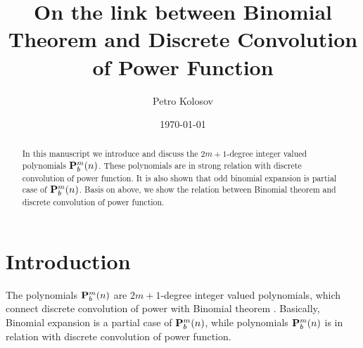 \documentclass[12pt,letterpaper,oneside,reqno]{amsart}
\title[On the link between Binomial Theorem and Disc. Conv. of Power Function]
{On the link between Binomial Theorem and Discrete Convolution of Power Function}
\author[Petro Kolosov]{Petro Kolosov}
\date{\today}
\newcommand \polynomialP [4][P]{{\mathbf{#1}}\sp{#2} \sb{#3}(#4)}
\numberwithin{equation}{section}
\begin{document}
    \begin{abstract}
        In this manuscript we introduce and discuss the $2m+1$-degree integer valued polynomials $\polynomialP{m}{b}{n}$.
        These polynomials are in strong relation with discrete convolution of power function.
        It is also shown that odd binomial expansion is partial case of $\polynomialP{m}{b}{n}$.
        Basis on above, we show the relation between Binomial theorem and discrete
        convolution of power function.
    \end{abstract}
    \maketitle
    \tableofcontents


    \section{Introduction}
    The polynomials $\polynomialP{m}{b}{n}$ are $2m+1$-degree integer valued polynomials, which connect discrete
    convolution \cite{DiscConv} of power with Binomial theorem \cite{AbraSteg72}.
    Basically, Binomial expansion is a partial case of $\polynomialP{m}{b}{n}$, while polynomials $\polynomialP{m}{b}{n}$
    is in relation with discrete convolution of power function.
\end{document}
